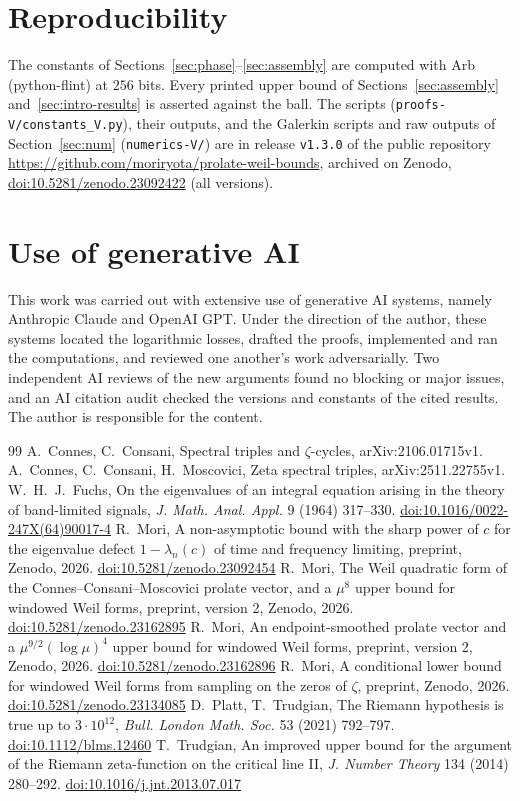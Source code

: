 \documentclass[11pt]{amsart}
\newcommand{\doi}[1]{\href{https://doi.org/#1}{doi:#1}}
\theoremstyle{remark}
\numberwithin{equation}{section}
\begin{document}
\section*{Reproducibility}
The constants of Sections~\ref{sec:phase}--\ref{sec:assembly} are computed with Arb (python-flint) at $256$ bits. Every printed upper bound of Sections~\ref{sec:assembly} and~\ref{sec:intro-results} is asserted against the ball. The scripts (\texttt{proofs-V/constants\_V.py}), their outputs, and the Galerkin scripts and raw outputs of Section~\ref{sec:num} (\texttt{numerics-V/}) are in release \texttt{v1.3.0} of the public repository \url{https://github.com/moriryota/prolate-weil-bounds}, archived on Zenodo, \doi{10.5281/zenodo.23092422} (all versions).

\section*{Use of generative AI}
This work was carried out with extensive use of generative AI systems, namely Anthropic Claude and OpenAI GPT. Under the direction of the author, these systems located the logarithmic losses, drafted the proofs, implemented and ran the computations, and reviewed one another's work adversarially. Two independent AI reviews of the new arguments found no blocking or major issues, and an AI citation audit checked the versions and constants of the cited results. The author is responsible for the content.

\begin{thebibliography}{99}
 A.~Connes, C.~Consani, Spectral triples and $\zeta$-cycles, arXiv:2106.01715v1.
 A.~Connes, C.~Consani, H.~Moscovici, Zeta spectral triples, arXiv:2511.22755v1.
 W.~H.~J.~Fuchs, On the eigenvalues of an integral equation arising in the theory of band-limited signals, \emph{J. Math. Anal. Appl.} 9 (1964) 317--330. \doi{10.1016/0022-247X(64)90017-4}
 R.~Mori, A non-asymptotic bound with the sharp power of $c$ for the eigenvalue defect $1-\lambda_n(c)$ of time and frequency limiting, preprint, Zenodo, 2026. \doi{10.5281/zenodo.23092454}
 R.~Mori, The Weil quadratic form of the Connes--Consani--Moscovici prolate vector, and a $\mu^8$ upper bound for windowed Weil forms, preprint, version 2, Zenodo, 2026. \doi{10.5281/zenodo.23162895}
 R.~Mori, An endpoint-smoothed prolate vector and a $\mu^{9/2}(\log\mu)^4$ upper bound for windowed Weil forms, preprint, version 2, Zenodo, 2026. \doi{10.5281/zenodo.23162896}
 R.~Mori, A conditional lower bound for windowed Weil forms from sampling on the zeros of $\zeta$, preprint, Zenodo, 2026. \doi{10.5281/zenodo.23134085}
 D.~Platt, T.~Trudgian, The Riemann hypothesis is true up to $3\cdot10^{12}$, \emph{Bull. London Math. Soc.} 53 (2021) 792--797. \doi{10.1112/blms.12460}
 T.~Trudgian, An improved upper bound for the argument of the Riemann zeta-function on the critical line II, \emph{J. Number Theory} 134 (2014) 280--292. \doi{10.1016/j.jnt.2013.07.017}
\end{thebibliography}
\end{document}
